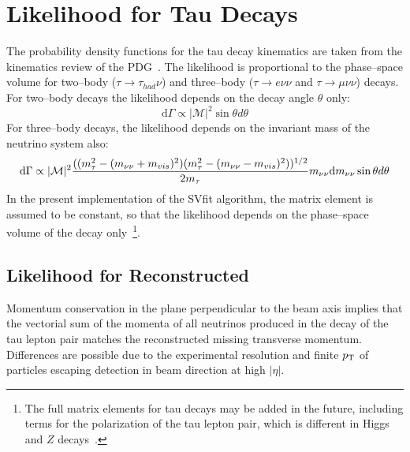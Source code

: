 \section{Likelihood for Tau Decays}

The probability density functions for the tau decay kinematics are taken from
the kinematics review of the PDG~\cite{PDG}.  The likelihood is proportional to
the phase--space volume for two--body ($\tau \to \tau_{had} \nu$) and
three--body ($\tau \to e \nu\nu$ and $\tau \to \mu \nu\nu$) decays.  For
two--body decays the likelihood depends on the decay angle $\theta$ only:
\begin{equation*}
\mathrm{d}\Gamma \propto |\mathcal{M}|^2 \sin \theta d \theta
\label{eq:pdfKineHadronic}
\end{equation*}
For three--body decays, the likelihood depends on the invariant mass of the
neutrino system also:
\begin{equation}
\mathrm{d}\Gamma \propto |\mathcal{M}|^2 
\frac{((m_{\tau}^2 - (m_{\nu\nu} + m_{vis})^2)(m_{\tau}^2 - (m_{\nu\nu} - m_{vis})^2))^{1/2}}
{2 m_{\tau}} 
m_{\nu\nu}
\mathrm{d}m_{\nu\nu}
\sin \theta d\theta 
\label{eq:pdfKineLeptonic}
\end{equation}
In the present implementation of the SVfit algorithm, the matrix element is
assumed to be constant, so that the likelihood depends on the phase--space
volume of the decay only~\footnote{The full matrix elements for tau decays may
be added in the future, including terms for the polarization of the tau lepton
pair, which is different in Higgs and $Z$ decays~\cite{tauDecayPolarization}.
}.


\subsection{Likelihood for Reconstructed \MET}

Momentum conservation in the plane perpendicular to the beam axis implies that
the vectorial sum of the momenta of all neutrinos produced in the decay of the
tau lepton pair matches the reconstructed missing transverse momentum.
Differences are possible due to the experimental resolution and finite $p_{\mathrm{T}}$
of particles escaping detection in beam direction at high $\left| \eta \right|$.

